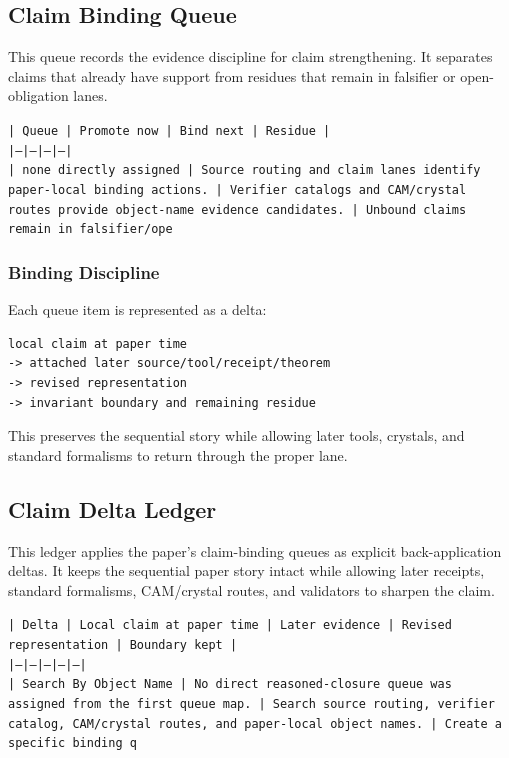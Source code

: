 \documentclass[11pt]{article}
\begin{document}
\subsection*{Claim Binding Queue}

This queue records the evidence discipline for claim strengthening. It separates claims that already have support from residues that remain in falsifier or open-obligation lanes.

\noindent\texttt{| Queue | Promote now | Bind next | Residue |}\\
\noindent\texttt{|---|---|---|---|}\\
\noindent\texttt{| none directly assigned | Source routing and claim lanes identify paper-local binding actions. | Verifier catalogs and CAM/crystal routes provide object-name evidence candidates. | Unbound claims remain in falsifier/ope}\\

\subsubsection*{Binding Discipline}

Each queue item is represented as a delta:

\begin{verbatim}
local claim at paper time
-> attached later source/tool/receipt/theorem
-> revised representation
-> invariant boundary and remaining residue
\end{verbatim}

This preserves the sequential story while allowing later tools, crystals, and
standard formalisms to return through the proper lane.

\subsection*{Claim Delta Ledger}

This ledger applies the paper's claim-binding queues as explicit back-application
deltas. It keeps the sequential paper story intact while allowing later
receipts, standard formalisms, CAM/crystal routes, and validators to sharpen the
claim.

\noindent\texttt{| Delta | Local claim at paper time | Later evidence | Revised representation | Boundary kept |}\\
\noindent\texttt{|---|---|---|---|---|}\\
\noindent\texttt{| Search By Object Name | No direct reasoned-closure queue was assigned from the first queue map. | Search source routing, verifier catalog, CAM/crystal routes, and paper-local object names. | Create a specific binding q}\\
\end{document}
